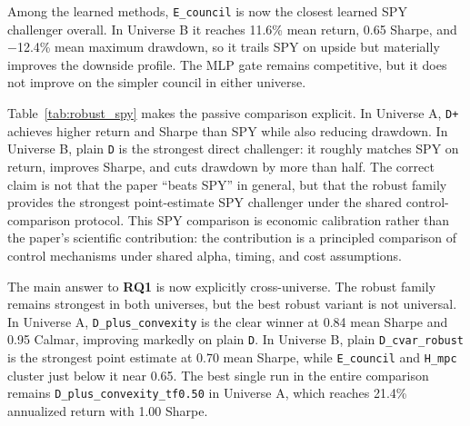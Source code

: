 \documentclass[10pt,twocolumn]{article}
\begin{document}
Among the learned methods, \texttt{E\_council} is now the closest learned SPY
challenger overall. In Universe B it reaches 11.6\% mean return, 0.65 Sharpe,
and $-$12.4\% mean maximum drawdown, so it trails SPY on upside but materially
improves the downside profile. The MLP gate remains competitive, but it does
not improve on the simpler council in either universe.

\begin{table}[t]
\centering
\small
\caption{Robust winner versus SPY in each universe across the same three
control-comparison splits.}
\label{tab:robust_spy}
\end{table}

Table~\ref{tab:robust_spy} makes the passive comparison explicit. In Universe A,
\texttt{D+} achieves higher return and Sharpe than SPY while also reducing
drawdown. In Universe B, plain \texttt{D} is the strongest direct challenger:
it roughly matches SPY on return, improves Sharpe, and cuts drawdown by more
than half. The correct claim is not that the paper ``beats SPY'' in general,
but that the robust family provides the strongest point-estimate SPY challenger
under the shared control-comparison protocol. This SPY comparison is economic
calibration rather than the paper's scientific contribution: the contribution
is a principled comparison of control mechanisms under shared alpha, timing,
and cost assumptions.

The main answer to \textbf{RQ1} is now explicitly cross-universe. The robust
family remains strongest in both universes, but the best robust variant is not
universal. In Universe A, \texttt{D\_plus\_convexity} is the clear winner at
0.84 mean Sharpe and 0.95 Calmar, improving markedly on plain \texttt{D}. In
Universe B, plain \texttt{D\_cvar\_robust} is the strongest point estimate at
0.70 mean Sharpe, while \texttt{E\_council} and \texttt{H\_mpc} cluster just
below it near 0.65. The best single run in the entire comparison remains
\texttt{D\_plus\_convexity\_tf0.50} in Universe A, which reaches 21.4\%
annualized return with 1.00 Sharpe.
\end{document}
